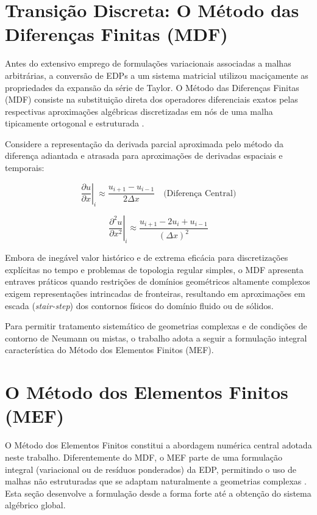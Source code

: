\section{Transição Discreta: O Método das Diferenças Finitas (MDF)}
\label{sec:introducao_mdf}

Antes do extensivo emprego de formulações variacionais associadas a malhas arbitrárias, a conversão de EDPs a um sistema matricial utilizou maciçamente as propriedades da expansão da série de Taylor. O Método das Diferenças Finitas (MDF) consiste na substituição direta dos operadores diferenciais exatos pelas respectivas aproximações algébricas discretizadas em nós de uma malha tipicamente ortogonal e estruturada \cite{Anjos2024}.

Considere a representação da derivada parcial aproximada pelo método da diferença adiantada e atrasada para aproximações de derivadas espaciais e temporais:

\begin{equation}
\left. \frac{\partial u}{\partial x} \right|_{i} \approx \frac{u_{i+1} - u_{i-1}}{2\Delta x} \quad \text{(Diferença Central)}
\label{eq:mdf_primeira_derivada}
\end{equation}

\begin{equation}
\left. \frac{\partial^2 u}{\partial x^2} \right|_{i} \approx \frac{u_{i+1} - 2u_i + u_{i-1}}{(\Delta x)^2}
\label{eq:mdf_segunda_derivada}
\end{equation}

Embora de inegável valor histórico e de extrema eficácia para discretizações explícitas no tempo e problemas de topologia regular simples, o MDF apresenta entraves práticos quando restrições de domínios geométricos altamente complexos exigem representações intrincadas de fronteiras, resultando em aproximações em escada (\textit{stair-step}) dos contornos físicos do domínio fluido ou de sólidos.

Para permitir tratamento sistemático de geometrias complexas e de condições de contorno de Neumann ou mistas, o trabalho adota a seguir a formulação integral característica do Método dos Elementos Finitos (MEF).

\section{O Método dos Elementos Finitos (MEF)}
\label{sec:mef}

O Método dos Elementos Finitos constitui a abordagem numérica central adotada neste trabalho. Diferentemente do MDF, o MEF parte de uma formulação integral (variacional ou de resíduos ponderados) da EDP, permitindo o uso de malhas não estruturadas que se adaptam naturalmente a geometrias complexas \cite{Zienkiewicz2013}. Esta seção desenvolve a formulação desde a forma forte até a obtenção do sistema algébrico global.

